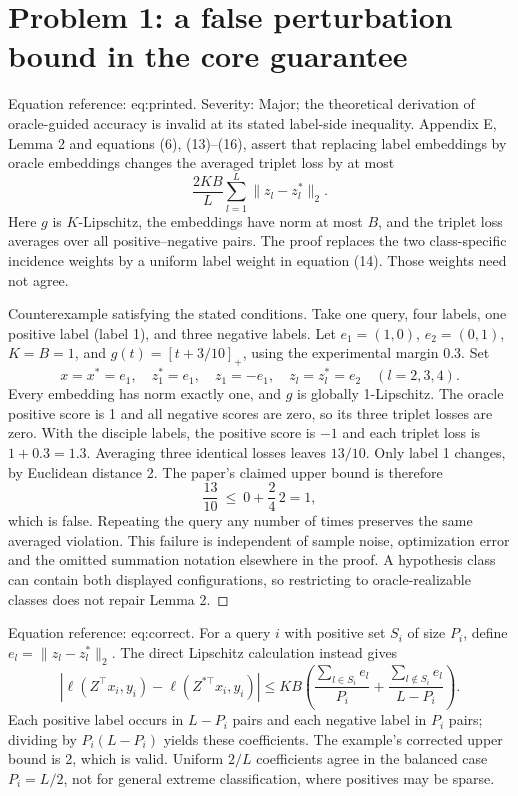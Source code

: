 \documentclass[10pt]{article}
\begin{document}
\section*{Problem 1: a false perturbation bound in the core guarantee}
Equation reference: eq:printed. Severity: Major; the theoretical derivation of oracle-guided accuracy is invalid at its stated label-side inequality. Appendix E, Lemma 2 and equations (6), (13)–(16), assert that replacing label embeddings by oracle embeddings changes the averaged triplet loss by at most \[
 \frac{2KB}{L}\sum_{l=1}^L\|z_l-z_l^*\|_2.\] Here \(g\) is \(K\)-Lipschitz, the embeddings have norm at most \(B\), and the triplet loss averages over all positive–negative pairs. The proof replaces the two class-specific incidence weights by a uniform label weight in equation (14). Those weights need not agree.\par
Counterexample satisfying the stated conditions. Take one query, four labels, one positive label (label 1), and three negative labels. Let \(e_1=(1,0)\), \(e_2=(0,1)\), \(K=B=1\), and \(g(t)=[t+3/10]_+\), using the experimental margin 0.3. Set \[x=x^*=e_1,\quad z_1^*=e_1,\quad z_1=-e_1,
 \quad z_l=z_l^*=e_2\quad(l=2,3,4).\] Every embedding has norm exactly one, and \(g\) is globally 1-Lipschitz. The oracle positive score is 1 and all negative scores are zero, so its three triplet losses are zero. With the disciple labels, the positive score is \(-1\) and each triplet loss is \(1+0.3=1.3\). Averaging three identical losses leaves \(13/10\). Only label 1 changes, by Euclidean distance 2. The paper’s claimed upper bound is therefore \[\frac{13}{10}\ \leq\ 0+\frac{2}{4}\,2=1,\] which is false. Repeating the query any number of times preserves the same averaged violation. This failure is independent of sample noise, optimization error and the omitted summation notation elsewhere in the proof. A hypothesis class can contain both displayed configurations, so restricting to oracle-realizable classes does not repair Lemma 2. ◻\par
Equation reference: eq:correct. For a query \(i\) with positive set \(S_i\) of size \(P_i\), define \(e_l=\|z_l-z_l^*\|_2\). The direct Lipschitz calculation instead gives \[
 |\ell(Z^\top x_i,y_i)-\ell(Z^{*\top}x_i,y_i)|
 \leq KB\left(\frac{\sum_{l\in S_i}e_l}{P_i}
 +\frac{\sum_{l\notin S_i}e_l}{L-P_i}\right).\] Each positive label occurs in \(L-P_i\) pairs and each negative label in \(P_i\) pairs; dividing by \(P_i(L-P_i)\) yields these coefficients. The example’s corrected upper bound is 2, which is valid. Uniform \(2/L\) coefficients agree in the balanced case \(P_i=L/2\), not for general extreme classification, where positives may be sparse.\par
\end{document}
